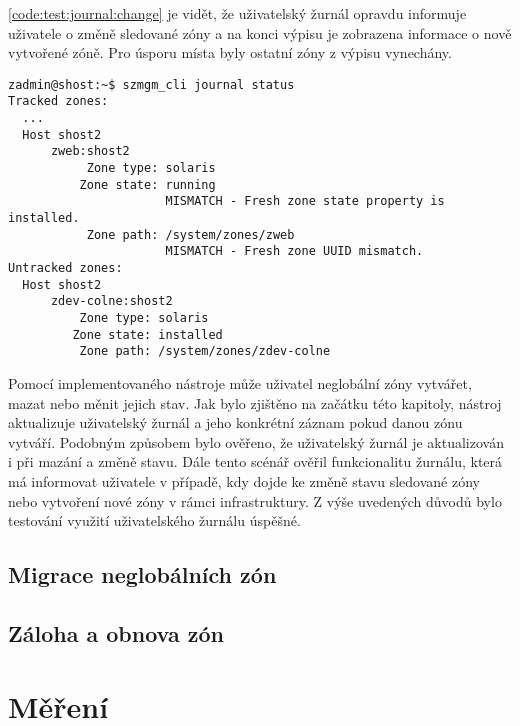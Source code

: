 \ref{code:test:journal:change} je vidět, že uživatelský žurnál opravdu informuje uživatele o změně sledované zóny a na konci
výpisu je zobrazena informace o nově vytvořené zóně. Pro úsporu místa byly ostatní zóny z výpisu vynechány.
\begin{lstlisting}[basicstyle=\scriptsize\ttfamily, caption={Uživatelské žurnál po změně}, float,label={code:test:journal:change}]  
zadmin@shost:~$ szmgm_cli journal status
Tracked zones:
  ...
  Host shost2
      zweb:shost2
           Zone type: solaris
          Zone state: running
                      MISMATCH - Fresh zone state property is installed.
           Zone path: /system/zones/zweb
                      MISMATCH - Fresh zone UUID mismatch.
Untracked zones:
  Host shost2
      zdev-colne:shost2
          Zone type: solaris
         Zone state: installed
          Zone path: /system/zones/zdev-colne
\end{lstlisting}

Pomocí implementovaného nástroje může uživatel neglobální zóny vytvářet, mazat nebo měnit jejich stav. Jak bylo zjištěno
na začátku této kapitoly, nástroj aktualizuje uživatelský žurnál a jeho konkrétní záznam pokud danou zónu vytváří. Podobným
způsobem bylo ověřeno, že uživatelský žurnál je aktualizován i při mazání a změně stavu. Dále tento scénář ověřil funkcionalitu
žurnálu, která má informovat uživatele v případě, kdy dojde ke změně stavu sledované zóny nebo vytvoření nové zóny v rámci
infrastruktury. Z výše uvedených důvodů bylo testování využití uživatelského žurnálu úspěšné.
\subsection{Migrace neglobálních zón}
\label{chapter:testing:scenario:migration}
\subsection{Záloha a obnova zón}
\label{chapter:testing:scenario:migration}

\section{Měření}
\label{chapter:measurement}